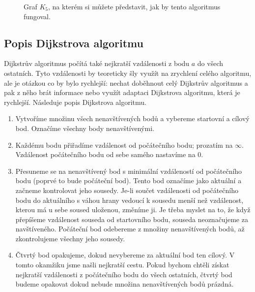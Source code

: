 \begin{figure}[H]
  \centering
  \caption{Graf $K_5$, na kterém si můžete představit, jak by tento algoritmus fungoval.}
\end{figure}

\subsection{Popis Dijkstrova algoritmu}
\label{subsec:popis-algoritmu}
Dijkstrův algoritmus počítá také nejkratší vzdálenosti z bodu $a$ do všech ostatních. Tyto vzdálenosti by teoreticky šly využít na zrychlení celého algoritmu, ale je otázkou co by bylo rychlejší: nechat doběhnout celý Dijkstrův algoritmus a pak z něho brát informace nebo využít adaptaci Dijkstrova algoritmu, která je rychlejší. Následuje popis Dijkstrova algoritmu.

\begin{enumerate}
  \item Vytvoříme množinu všech nenavštívených bodů a vybereme startovní a cílový bod. Označíme všechny body nenavštívenými.
  \item Každému bodu přiřadíme vzdálenost od počátečního bodu; prozatím na $\infty$. Vzdálenost počátečního bodu od sebe samého nastavíme na $0$.
  \item Přesuneme se na nenavštívený bod s minimální vzdáleností od počátečního bodu (poprvé to bude počáteční bod).
        Tento bod označíme jako aktuální a začneme kontrolovat jeho sousedy.
        Je-li součet vzdálenosti od počátečního bodu do aktuálního s váhou hrany vedoucí k sousedu menší než vzdálenost, kterou má u sebe soused uloženou, změníme ji.
        Je třeba myslet na to, že když přepíšeme vzdálenost souseda od startovního bodu, souseda neoznačujeme za navštíveného. Počáteční bod odebereme z množiny nenavštívených bodů, až zkontrolujeme všechny jeho sousedy.
  \item Čtvrtý bod opakujeme, dokud nevybereme za aktuální bod ten cílový. V tomto okamžiku jsme našli nejkratší cestu. Pokud bychom chtěli získat nejkratší vzdálenosti z počátečního bodu do všech ostatních, čtvrtý bod budeme opakovat dokud nebude množina nenavštívených bodů prázdná.
\end{enumerate}